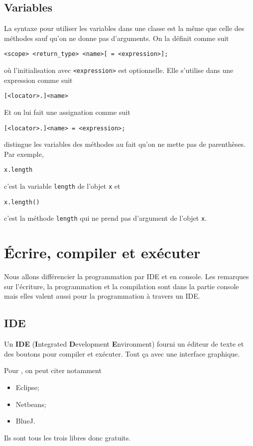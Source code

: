 \subsection{Variables}
La syntaxe pour utiliser les variables dans une classe est la même
que celle des méthodes sauf qu'on ne donne pas d'arguments.
On la définit comme suit
\begin{lstlisting}
<scope> <return_type> <name>[ = <expression>];
\end{lstlisting}
où l'initialisation avec \verb|<expression>| est optionnelle.
Elle s'utilise dans une expression comme suit
\begin{lstlisting}
[<locator>.]<name>
\end{lstlisting}
Et on lui fait une assignation comme suit
\begin{lstlisting}
[<locator>.]<name> = <expression>;
\end{lstlisting}

\java{} distingue les variables des méthodes au fait qu'on ne mette pas
de parenthèses.
Par exemple,
\begin{lstlisting}
x.length
\end{lstlisting}
c'est la variable \verb|length| de l'objet \verb|x| et
\begin{lstlisting}
x.length()
\end{lstlisting}
c'est la méthode \verb|length| qui ne prend pas d'argument de l'objet \verb|x|.


\annexe
\section{Écrire, compiler et exécuter}
Nous allons différencier la programmation par IDE et en console.
Les remarques sur l'écriture, la programmation et la compilation
sont dans la partie console mais elles valent aussi pour la
programmation à travers un IDE.

\subsection{IDE}
Un \textbf{IDE} (\textbf{I}ntegrated \textbf{D}evelopment \textbf{E}nvironment)
fourni un éditeur de texte et des boutons pour compiler et exécuter.
Tout ça avec une interface graphique.

Pour \java{}, on peut citer notamment
\begin{itemize}
  \item Eclipse;
  \item Netbeans;
  \item BlueJ.
\end{itemize}
Ils sont tous les trois libres donc gratuits.

